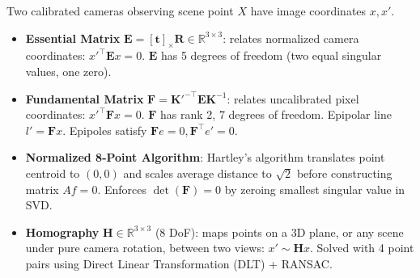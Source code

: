 \begin{mem}
Two calibrated cameras observing scene point $X$ have image coordinates $x, x'$.
\begin{itemize}
\item \textbf{Essential Matrix} $\mathbf{E} = [\mathbf{t}]_\times \mathbf{R} \in \mathbb{R}^{3\times 3}$: relates normalized camera coordinates: $x'^\top \mathbf{E} x = 0$. $\mathbf{E}$ has 5 degrees of freedom (two equal singular values, one zero).
\item \textbf{Fundamental Matrix} $\mathbf{F} = \mathbf{K}'^{-\top} \mathbf{E} \mathbf{K}^{-1}$: relates uncalibrated pixel coordinates: $x'^\top \mathbf{F} x = 0$. $\mathbf{F}$ has rank 2, 7 degrees of freedom. Epipolar line $l' = \mathbf{F} x$. Epipoles satisfy $\mathbf{F} e = 0, \mathbf{F}^\top e' = 0$.
\item \textbf{Normalized 8-Point Algorithm}: Hartley's algorithm translates point centroid to $(0,0)$ and scales average distance to $\sqrt{2}$ before constructing matrix $A f = 0$. Enforces $\det(\mathbf{F})=0$ by zeroing smallest singular value in SVD.
\item \textbf{Homography} $\mathbf{H} \in \mathbb{R}^{3\times 3}$ (8 DoF): maps points on a 3D plane, or any scene under pure camera rotation, between two views: $x' \sim \mathbf{H} x$. Solved with 4 point pairs using Direct Linear Transformation (DLT) + RANSAC.
\end{itemize}
\end{mem}

